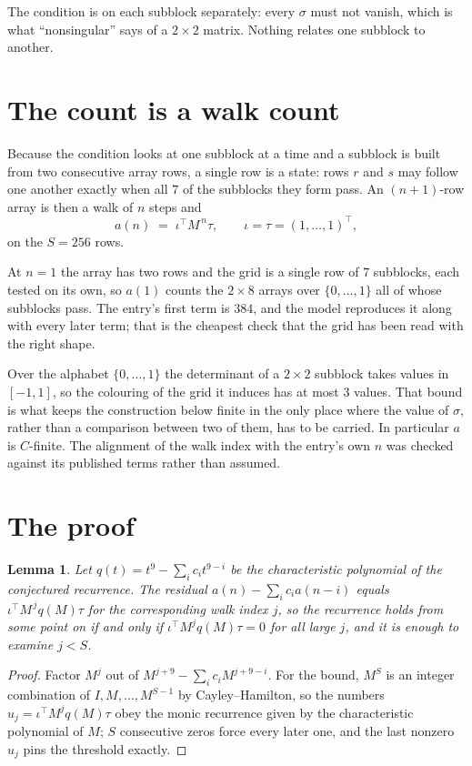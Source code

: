 \documentclass[11pt,a4paper]{article}
\theoremstyle{plain}
\newtheorem{lemma}[theorem]{Lemma}
\theoremstyle{definition}
\begin{document}
The condition is on each subblock separately: every $\sigma$ must not vanish, which is what
``nonsingular'' says of a $2\times2$ matrix. Nothing
relates one subblock to another.

\section{The count is a walk count}

Because the condition looks at one subblock at a time and a subblock is
built from two consecutive array rows, a single row is a state: rows $r$ and $s$ may follow one
another exactly when all $7$ of the subblocks they form pass. An $(n+1)$-row array is then a
walk of $n$ steps and
\[
a(n)\;=\;\iota^{\!\top}M^{\,n}\tau,\qquad\iota=\tau=(1,\dots,1)^{\!\top},
\]
on the $S=256$ rows.

At $n=1$ the array has two rows and the grid is a single row of $7$
subblocks, each tested on its own, so $a(1)$ counts the
$2\times8$ arrays over $\{0,\dots,1\}$ all of whose subblocks pass. The entry's
first term is $384$, and the model reproduces it along with every later term; that is the
cheapest check that the grid has been read with the right shape.

Over the alphabet $\{0,\dots,1\}$ the determinant of a $2\times2$ subblock takes values in
$[-1,1]$, so the colouring of the grid it induces has at most $3$ values.
That bound is what keeps the construction below finite in the only place where the value of
$\sigma$, rather than a comparison between two of them, has to be carried.
In particular $a$ is $C$-finite. The alignment of the walk index with the entry's own $n$ was
checked against its published terms rather than assumed.

\section{The proof}

\begin{lemma}\label{lem:crit}
Let $q(t)=t^{9}-\sum_i c_it^{9-i}$ be the characteristic polynomial of the
conjectured recurrence. The residual $a(n)-\sum_ic_ia(n-i)$ equals
$\iota^{\!\top}M^{\,j}q(M)\tau$ for the corresponding walk index $j$, so the recurrence
holds from some point on if and only if $\iota^{\!\top}M^{j}q(M)\tau=0$ for all large $j$,
and it is enough to examine $j<S$.
\end{lemma}

\begin{proof}
Factor $M^{j}$ out of $M^{j+9}-\sum_ic_iM^{j+9-i}$. For the bound, $M^{S}$
is an integer combination of $I,M,\dots,M^{S-1}$ by Cayley--Hamilton, so the numbers
$u_j=\iota^{\!\top}M^{j}q(M)\tau$ obey the monic recurrence given by the characteristic
polynomial of $M$; $S$ consecutive zeros force every later one, and the last nonzero $u_j$
pins the threshold exactly.
\end{proof}
\end{document}
